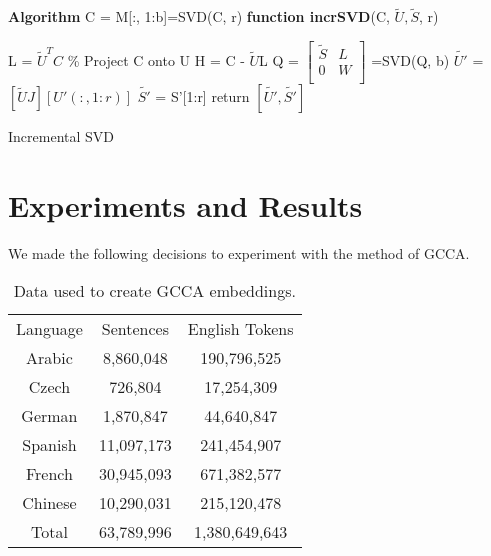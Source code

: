 \documentclass[11pt]{article}
\begin{document}
\begin{algorithm}[htp]
  \label{alg:incsvd}
 \textbf{Algorithm}\;
 C = M[:, 1:b]=SVD(C, r)\;
 \textbf{function incrSVD}(C, $\widetilde{U}, \widetilde{S}$, r)
 
 
 L = $\widetilde{U}^TC$ \% Project C onto U \;
 H = C - $\widetilde{U}$L\;
 Q = $\begin{bmatrix} 
   \widetilde{S} & L\\
   0 & W \\
   \end{bmatrix}$ \;
 [$U', S', V'$]=SVD(Q, b)\;
 $\widetilde{U'}$ = $[\widetilde{U} J][U'(:, 1:r)]$\;
 $\widetilde{S'}$ = S'[1:r]\;
 return $[\widetilde{U'}, \widetilde{S'}]$\;
 \caption{Incremental SVD}
\end{algorithm}








\section{Experiments and Results}
We made the following decisions to experiment with the method of GCCA.
\begin{table}[htbp]
  \centering
  \begin{tabular}{ccc}
    Language & Sentences & English Tokens \\
    Arabic   & 8,860,048   & 190,796,525  \\
    Czech    & 726,804     & 17,254,309   \\
    German   & 1,870,847   & 44,640,847   \\
    Spanish  & 11,097,173  & 241,454,907  \\
    French   & 30,945,093  & 671,382,577  \\
    Chinese  & 10,290,031  & 215,120,478  \\
    Total    & 63,789,996  & 1,380,649,643  \\
  \end{tabular}  
  \caption{Data used to create GCCA embeddings.}
  \label{tab:dataperlang}
\end{table}
\end{document}
